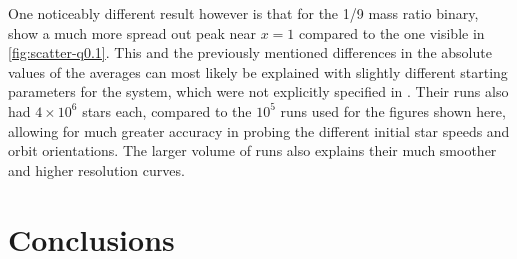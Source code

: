 \documentclass[english, oneside]{HYgradu}
\begin{document}
One noticeably different result however is that for the 1/9 mass ratio binary, \cite{sesana:2006} show a much more spread out peak near $x=1$ compared to the one visible in \ref{fig:scatter-q0.1}. This and the previously mentioned differences in the absolute values of the averages can most likely be explained with slightly different starting parameters for the system, which were not explicitly specified in \cite{sesana:2006}. Their runs also had $4 \times 10^6$ stars each, compared to the $10^5$ runs used for the figures shown here, allowing for much greater accuracy in probing the different initial star speeds and orbit orientations. The larger volume of runs also explains their much smoother and higher resolution curves.


\chapter{Conclusions}





\clearpage
{} %

\small

\label{pagecount}
\end{document}

